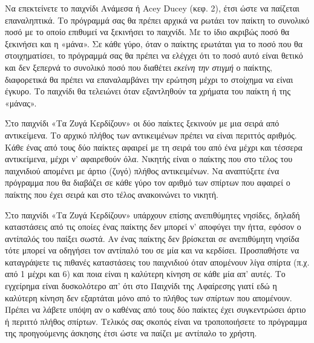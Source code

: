 \documentclass[a4paper,11pt,oneside]{book}
\begin{document}
\begin{exercise}
Να επεκτείνετε το παιχνίδι Ανάμεσα ή Acey Ducey (κεφ. 2), έτσι ώστε να παίζεται επαναληπτικά. Το πρόγραμμά σας θα πρέπει αρχικά να ρωτάει τον παίκτη το συνολικό ποσό με το οποίο επιθυμεί να ξεκινήσει το παιχνίδι. Με το ίδιο ακριβώς ποσό θα ξεκινήσει και η «μάνα». Σε κάθε γύρο, όταν ο παίκτης ερωτάται για το ποσό που θα στοιχηματίσει, το πρόγραμμά σας θα πρέπει να ελέγχει ότι το ποσό αυτό είναι θετικό και δεν ξεπερνά το συνολικό ποσό που διαθέτει \emph{εκείνη την στιγμή} ο παίκτης, διαφορετικά θα πρέπει να επαναλαμβάνει την ερώτηση μέχρι το στοίχημα να είναι έγκυρο. Το παιχνίδι θα τελειώνει όταν εξαντληθούν τα χρήματα του παίκτη ή της «μάνας». 
\end{exercise}

\begin{exercise}
Στο παιχνίδι «Τα Ζυγά Κερδίζουν» οι δύο παίκτες ξεκινούν με μια σειρά από αντικείμενα. Το αρχικό πλήθος των αντικειμένων πρέπει να είναι περιττός αριθμός. Κάθε ένας από τους δύο παίκτες αφαιρεί με τη σειρά του από ένα μέχρι και τέσσερα αντικείμενα, μέχρι ν' αφαιρεθούν όλα. Νικητής είναι ο παίκτης που στο τέλος του παιχνιδιού απομένει με άρτιο (ζυγό) πλήθος αντικειμένων. Να αναπτύξετε ένα πρόγραμμα που θα διαβάζει σε κάθε γύρο τον αριθμό των σπίρτων που αφαιρεί ο παίκτης που έχει σειρά και στο τέλος ανακοινώνει το νικητή.
\end{exercise}

\begin{exercise}
Στο παιχνίδι «Τα Ζυγά Κερδίζουν» υπάρχουν επίσης ανεπιθύμητες νησίδες, δηλαδή καταστάσεις από τις οποίες ένας παίκτης δεν μπορεί ν' αποφύγει την ήττα, εφόσον ο αντίπαλός του παίξει σωστά. Αν ένας παίκτης δεν βρίσκεται σε ανεπιθύμητη νησίδα τότε μπορεί να οδηγήσει τον αντίπαλό του σε μία και να κερδίσει. Προσπαθήστε να καταγράψετε τις πιθανές καταστάσεις του παιχνιδιού όταν απομένουν λίγα σπίρτα (π.χ. από 1 μέχρι και 6) και ποια είναι η καλύτερη κίνηση σε κάθε μία απ' αυτές. Το εγχείρημα είναι δυσκολότερο απ' ότι στο Παιχνίδι της Αφαίρεσης γιατί εδώ η καλύτερη κίνηση δεν εξαρτάται μόνο από το πλήθος των σπίρτων που απομένουν. Πρέπει να λάβετε υπόψη αν ο καθένας από τους δύο παίκτες έχει συγκεντρώσει άρτιο ή περιττό πλήθος σπίρτων. Τελικός σας σκοπός είναι να τροποποιήσετε το πρόγραμμα της προηγούμενης άσκησης έτσι ώστε να παίζει με αντίπαλο το χρήστη.
\end{exercise}
\end{document}
